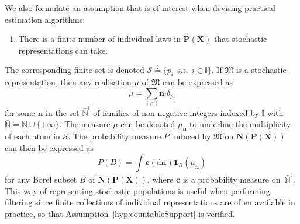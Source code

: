 \documentclass{aptpub}
\numberwithin{equation}{section}
\begin{document}
We also formulate an assumption that is of interest when devising practical estimation algorithms:
\begin{enumerate}[resume*=hyp]
\item \label{hyp:countableSupport} There is a finite number of individual laws in ${\mathbf{P}}({\mathbf{X}})$ that stochastic representations can take.
\end{enumerate}
The corresponding finite set is denoted ${\mathcal{S}} {\doteq} \{p_i {\;\,\mbox{s.t.}\;\,} i \in {\mathbb{I}}\}$. If ${\mathfrak{M}}$ is a stochastic representation, then any realisation $\mu$ of ${\mathfrak{M}}$ can be expressed as
{\begin{equation*}{
\mu = \sum_{i \in {\mathbb{I}}} {\boldsymbol{n}}_i\delta_{p_i}
}\end{equation*}}
for some ${\boldsymbol{n}}$ in the set $\bar{\mathbb{N}}^{\mathbb{I}}$ of families of non-negative integers indexed by ${\mathbb{I}}$ with $\bar{\mathbb{N}} = {\mathbb{N}} \cup \{+\infty\}$. The measure $\mu$ can be denoted $\mu_{\boldsymbol{n}}$ to underline the multiplicity of each atom in ${\mathcal{S}}$. The probability measure $P$ induced by ${\mathfrak{M}}$ on ${\mathbf{N}}({\mathbf{P}}({\mathbf{X}}))$ can then be expressed as
{\begin{equation*}{
P(B) = \int {\boldsymbol{c}}({\mathrm{d}}{\boldsymbol{n}}) {{\mathbf{1}}_{{B}}}(\mu_{\boldsymbol{n}})
}\end{equation*}}
for any Borel subset $B$ of ${\mathbf{N}}({\mathbf{P}}({\mathbf{X}}))$, where ${\boldsymbol{c}}$ is a probability measure on~$\bar{\mathbb{N}}^{\mathbb{I}}$. This way of representing stochastic populations is useful when performing filtering \cite[Chapt.~3]{Houssineau2015} since finite collections of individual representations are often available in practice, so that Assumption~\ref{hyp:countableSupport} is verified.
\end{document}
